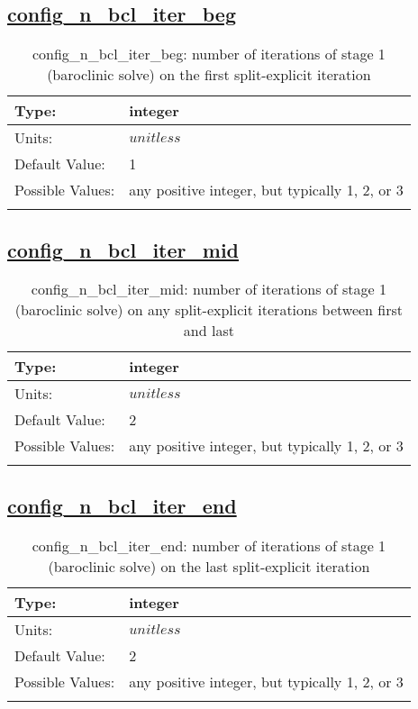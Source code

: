 \subsection[config\_n\_bcl\_iter\_beg]{\hyperref[sec:nm_tab_split_explicit_ts]{config\_n\_bcl\_iter\_beg}}
\label{subsec:nm_sec_config_n_bcl_iter_beg}
\begin{center}
\begin{longtable}{| p{2.0in} | p{4.0in} |}
    \hline
    Type: & integer \\
    \hline
    Units: & $unitless$ \\
    \hline
    Default Value: & 1 \\
    \hline
    Possible Values: & any positive integer, but typically 1, 2, or 3 \\
    \hline
    \caption{config\_n\_bcl\_iter\_beg: number of iterations of stage 1 (baroclinic solve) on the first split-explicit iteration}
\end{longtable}
\end{center}
\subsection[config\_n\_bcl\_iter\_mid]{\hyperref[sec:nm_tab_split_explicit_ts]{config\_n\_bcl\_iter\_mid}}
\label{subsec:nm_sec_config_n_bcl_iter_mid}
\begin{center}
\begin{longtable}{| p{2.0in} | p{4.0in} |}
    \hline
    Type: & integer \\
    \hline
    Units: & $unitless$ \\
    \hline
    Default Value: & 2 \\
    \hline
    Possible Values: & any positive integer, but typically 1, 2, or 3 \\
    \hline
    \caption{config\_n\_bcl\_iter\_mid: number of iterations of stage 1 (baroclinic solve) on any split-explicit iterations between first and last}
\end{longtable}
\end{center}
\subsection[config\_n\_bcl\_iter\_end]{\hyperref[sec:nm_tab_split_explicit_ts]{config\_n\_bcl\_iter\_end}}
\label{subsec:nm_sec_config_n_bcl_iter_end}
\begin{center}
\begin{longtable}{| p{2.0in} | p{4.0in} |}
    \hline
    Type: & integer \\
    \hline
    Units: & $unitless$ \\
    \hline
    Default Value: & 2 \\
    \hline
    Possible Values: & any positive integer, but typically 1, 2, or 3 \\
    \hline
    \caption{config\_n\_bcl\_iter\_end: number of iterations of stage 1 (baroclinic solve) on the last split-explicit iteration}
\end{longtable}
\end{center}
